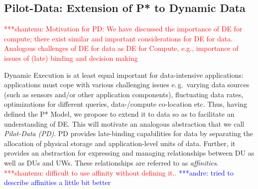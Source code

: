 \documentclass[conference,final]{IEEEtran}
\newcommand{\jhanote}[1]{ {\textcolor{red} { ***shantenu: #1 }}}
\newcommand{\alnote}[1]{ {\textcolor{blue} { ***andre: #1 }}}
\newcommand{\alnote}[1]{}
\newcommand{\jhanote}[1]{}
\newcommand{\upp}{\vspace*{-0.5em}}
\begin{document}
\subsection{Pilot-Data: Extension of P* to Dynamic Data\upp\upp}
\label{sec:pilot-data}







\jhanote{Motivation for PD: We have discussed the importance of DE for
  compute; there exist similar and important considerations for DE for
  data. Analogous challenges of DE for data as DE for Compute, e.g.,
  importance of issues of (late) binding and decision making} 

Dynamic Execution is at least equal important for data-intensive applications:
applications must cope with various challenging issues e.\,g.\ varying data
sources (such as sensors and/or other application components), fluctuating data
rates, optimizations for different queries, data-/compute co-location etc. Thus,
having defined the P* Model, we propose to extend it to data so as to facilitate
an understanding of DE. This will motivate an analogous abstraction that we call
\emph{Pilot-Data (PD)}. PD provides late-binding capabilities for data by
separating the allocation of physical storage and application-level units of
data. Further, it provides an abstraction for expressing and managing
relationships between DU as well as DUs and UWs. These relationships are
referred to as
\emph{affinities}.
\jhanote{difficult to use affinity
  without defining it..}
\alnote{tried to describe affinities a little bit better}
\end{document}
